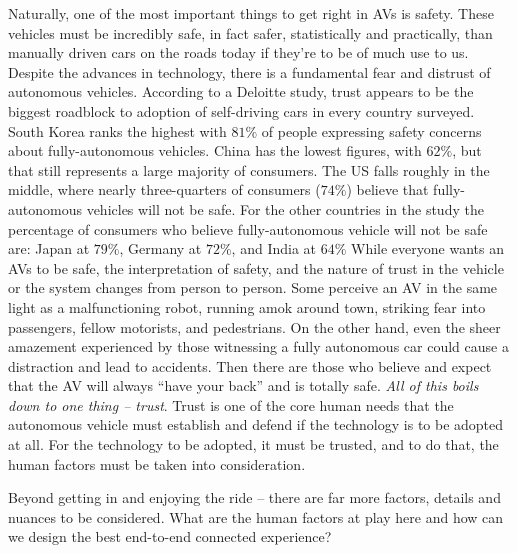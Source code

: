 Naturally, one of the most important things to get right in AVs is safety. 
These vehicles must be incredibly safe, in fact safer, statistically and practically, than manually driven cars on the roads today if they’re to be of much use to us. 
Despite the advances in technology, there is a fundamental fear and distrust of autonomous vehicles. 
According to a Deloitte study, trust appears to be the biggest roadblock to adoption of self-driving cars in every country surveyed. South Korea ranks the highest with $81\%$ of people expressing safety concerns about fully-autonomous vehicles. 
China has the lowest figures, with $62\%$, but that still represents a large majority of consumers. 
The US falls roughly in the middle, where nearly three-quarters of consumers ($74\%$) believe that fully-autonomous vehicles will not be safe. 
For the other countries in the study the percentage of consumers who believe fully-autonomous vehicle will not be safe are: Japan at $79\%$, Germany at $72\%$, and India at $64\%$
While everyone wants an AVs to be safe, the interpretation of safety, and the nature of trust in the vehicle or the system changes from person to person.
Some perceive an AV in the same light as a malfunctioning robot, running amok around town, striking fear into passengers, fellow motorists, and pedestrians.
On the other hand, even the sheer amazement experienced by those witnessing a fully autonomous car could cause a distraction and lead to accidents. 
Then there are those who believe and expect that the AV will always ``have your back'' and is totally safe.
\textit{All of this boils down to one thing – trust}. 
Trust is one of the core human needs that the autonomous vehicle must establish and defend if the technology is to be adopted at all.
For the technology to be adopted, it must be trusted, and to do that, the human factors must be taken into consideration. 

Beyond getting in and enjoying the ride – there are far more factors, details and nuances to be considered. What are the human factors at play here and how can we design the best end-to-end connected experience?
